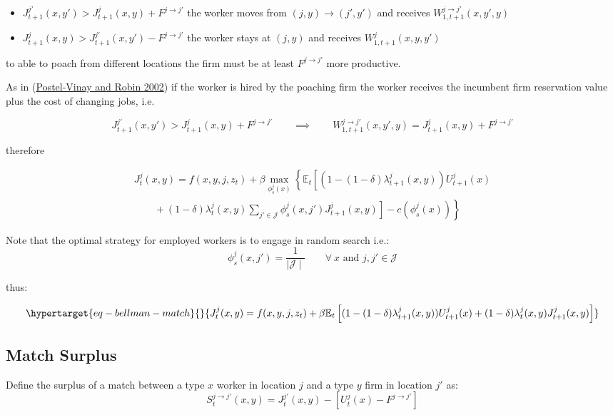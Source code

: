 \documentclass[
  letterpaper,
  DIV=11,
  numbers=noendperiod]{scrreprt}
\providecommand{\tightlist}{%
  \setlength{\itemsep}{0pt}\setlength{\parskip}{0pt}}\usepackage{longtable,booktabs,array}
\begin{document}
\begin{itemize}
\tightlist
\item
  \(J^{j'}_{t+1}(x,y')>J^j_{t+1}(x,y)+F^{j\to j'}\) the worker moves
  from \((j,y) \to (j',y')\) and receives
  \(W^{j\to j'}_{1,t+1}(x,y',y)\)
\item
  \(J^j_{t+1}(x,y)>J^{j'}_{t+1}(x,y')-F^{j\to j'}\) the worker stays at
  \((j,y)\) and receives \(W^{j}_{1,t+1}(x,y,y')\)
\end{itemize}

to able to poach from different locations the firm must be at least
\(F^{j\to j'}\) more productive.

As in
(\protect\hyperlink{ref-postel-vinayEquilibriumWageDispersion2002}{Postel-Vinay
and Robin 2002}) if the worker is hired by the poaching firm the worker
receives the incumbent firm reservation value plus the cost of changing
jobs, i.e.

\[J^{j'}_{t+1}(x,y')>J^{j}_{t+1}(x,y)+F^{j\to j'}  \qquad \implies \qquad W^{j\to j'}_{1,t+1}(x,y',y) = J^{j}_{t+1}(x,y)+F^{j\to j'}\]

therefore

\begin{align*}
    J^j_{t}(x,y)=f(x,y,j,z_t)+\beta\max_{\phi^j_s(x)}\left\{\mathbb{E}_t\left[(1 - (1-\delta)\lambda^j_{t+1}(x,y))U^j_{t+1}(x) \right.\right. \\ \left.\left. \qquad + (1-\delta) \lambda^j_t(x,y)\sum_{j'\in\mathcal{J}}\phi_s^j(x,j')J^j_{t+1}(x,y)\right] - c(\phi^j_s(x))\right\}
\end{align*}

Note that the optimal strategy for employed workers is to engage in
random search i.e.:
\[\phi_{s}^{j}(x, j') = \frac{1}{\mid\mathcal{J}\mid} \qquad \forall\:x \text{ and }j,j'\in\mathcal{J}\]

thus:

\begin{equation}\protect\hypertarget{eq-bellman-match}{}{J^j_{t}(x,y)=f(x,y,j,z_t)+\beta\mathbb{E}_t\left[(1 - (1-\delta)\lambda^j_{t+1}(x,y))U^j_{t+1}(x) + (1-\delta) \lambda^j_t(x,y)J^j_{t+1}(x,y)\right]}\label{eq-bellman-match}\end{equation}

\hypertarget{match-surplus}{%
\subsection{Match Surplus}\label{match-surplus}}

Define the surplus of a match between a type \(x\) worker in location
\(j\) and a type \(y\) firm in location \(j'\) as:
\[S^{j\to j'}_{t}(x,y) = J^{j'}_{t}(x,y) - [U^{j}_t(x) - F^{j\to j'}]\]
\end{document}
